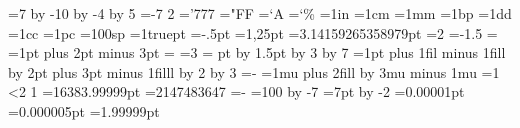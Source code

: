=7 \advance{} by -10 
\multiply{} by -4 
\divide{} by 5 
=-7 \divide{} 2 
='777 ="FF =`A =`\% 
=1in 
=1cm  =1mm 
=1bp  =1dd 
=1cc  =1pc 
=100sp  =1truept 
=-.5pt  =1,25pt 
=3.14159265358979pt 
=2  =-1.5 
= 
=1pt plus 2pt minus 3pt = 
=3 = pt 
\advance{} by 1.5pt \multiply{} by 3 
\divide{} by 7 
=1pt plus 1fil minus 1fill \advance{} by 2pt plus 3pt minus 1filll 
\multiply{} by 2  \divide{} by 3 
=- 
=1mu plus 2fill 
\advance{} by 3mu minus 1mu 
=1 \ifnum{}<2 \advance{} 1 \fi {}
=16383.99999pt 
=2147483647 
=- 
=100 \divide{} by -7 
=7pt \divide{} by -2 
=0.00001pt  =0.000005pt 
=1.99999pt 
